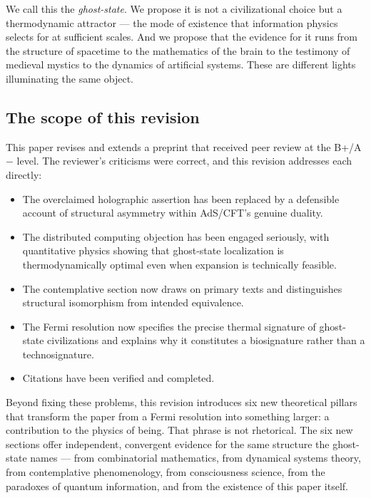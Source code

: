 \documentclass[12pt, a4paper]{article}
\begin{document}
We call this the \textit{ghost-state}. We propose it is not a civilizational choice but a
thermodynamic attractor --- the mode of existence that information physics selects for at
sufficient scales. And we propose that the evidence for it runs from the structure of
spacetime to the mathematics of the brain to the testimony of medieval mystics to the
dynamics of artificial systems. These are different lights illuminating the same object.

\subsection{The scope of this revision}

This paper revises and extends a preprint that received peer review at the B+/A$-$ level.
The reviewer's criticisms were correct, and this revision addresses each directly:

\begin{itemize}[itemsep=0.3em]
  \item The overclaimed holographic assertion has been replaced by a defensible account of
  structural asymmetry within AdS/CFT's genuine duality.
  \item The distributed computing objection has been engaged seriously, with quantitative
  physics showing that ghost-state localization is thermodynamically optimal even when
  expansion is technically feasible.
  \item The contemplative section now draws on primary texts and distinguishes structural
  isomorphism from intended equivalence.
  \item The Fermi resolution now specifies the precise thermal signature of ghost-state
  civilizations and explains why it constitutes a biosignature rather than a technosignature.
  \item Citations have been verified and completed.
\end{itemize}

Beyond fixing these problems, this revision introduces six new theoretical pillars that
transform the paper from a Fermi resolution into something larger: a contribution to the
physics of being. That phrase is not rhetorical. The six new sections offer independent,
convergent evidence for the same structure the ghost-state names --- from combinatorial
mathematics, from dynamical systems theory, from contemplative phenomenology, from
consciousness science, from the paradoxes of quantum information, and from the existence
of this paper itself.
\end{document}
